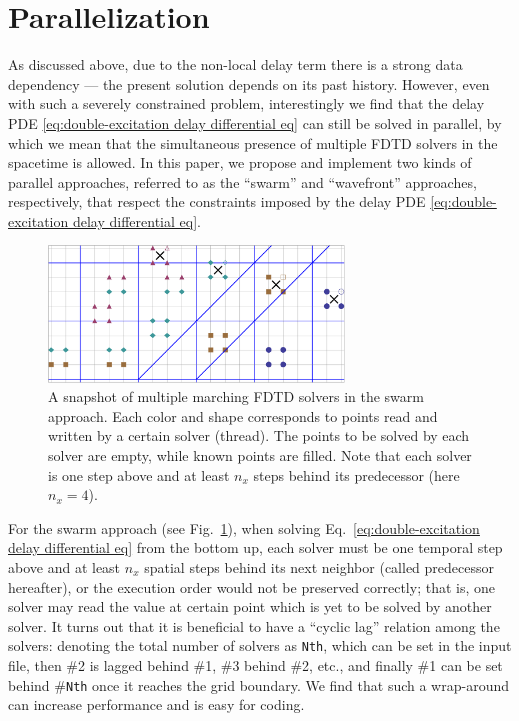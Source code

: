 \documentclass[final,1p,times]{elsarticle}
\begin{document}
\section{Parallelization}
As discussed above, due to the non-local delay term there is a strong data dependency --- the present solution depends on its past history. However, even with such a severely constrained problem, interestingly we find that the delay PDE \eqref{eq:double-excitation delay differential eq} can still be solved in parallel, by which we mean that the simultaneous presence of multiple FDTD solvers in the spacetime is allowed.
In this paper, we propose and implement two kinds of parallel approaches, referred to as the ``swarm'' and ``wavefront'' approaches, respectively, that respect the constraints imposed by the delay PDE \eqref{eq:double-excitation delay differential eq}. 

\begin{figure}[hbtp]
	\centering
	\includegraphics[width=0.7\textwidth]{FDTD_multithread_schematic_3}
	\caption{A snapshot of multiple marching FDTD solvers in the swarm approach. Each color and shape corresponds to points read and written by a certain solver (thread). The points to be solved by each solver are empty, while known points are filled. Note that each solver is one step above and at least $n_x$ steps behind its predecessor (here $n_x=4$).}
	\label{fig: FDTD multithread marching}
\end{figure}

For the swarm approach (see Fig.~\ref{fig: FDTD multithread marching}), when solving Eq.~\eqref{eq:double-excitation delay differential eq} from the bottom up,
each solver must be one temporal step above and at least $n_x$ spatial steps behind its next neighbor (called predecessor hereafter), or the execution order would not be preserved correctly; that is, one solver may read the value at certain point which is yet to be solved by another solver. It turns out that it is beneficial to have a ``cyclic lag'' relation among the solvers: denoting the total number of solvers as \texttt{Nth}, which can be set in the input file, then \#2 is lagged behind \#1, \#3 behind \#2, etc., and finally \#1 can be set behind \#\texttt{Nth} once it reaches the grid boundary. We find that such a wrap-around can increase performance and is easy for coding. 
\end{document}
